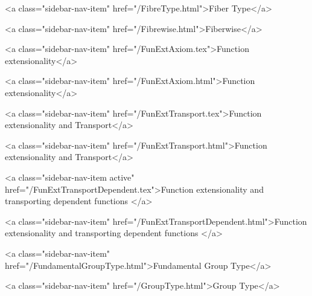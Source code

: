       
    
      
        
          <a class="sidebar-nav-item" href="/FibreType.html">Fiber Type</a>
        
      
    
      
        
          <a class="sidebar-nav-item" href="/Fibrewise.html">Fiberwise</a>
        
      
    
      
        
          <a class="sidebar-nav-item" href="/FunExtAxiom.tex">Function extensionality</a>
        
      
    
      
        
          <a class="sidebar-nav-item" href="/FunExtAxiom.html">Function extensionality</a>
        
      
    
      
        
          <a class="sidebar-nav-item" href="/FunExtTransport.tex">Function extensionality and Transport</a>
        
      
    
      
        
          <a class="sidebar-nav-item" href="/FunExtTransport.html">Function extensionality and Transport</a>
        
      
    
      
        
          <a class="sidebar-nav-item active" href="/FunExtTransportDependent.tex">Function extensionality and transporting dependent functions </a>
        
      
    
      
        
          <a class="sidebar-nav-item" href="/FunExtTransportDependent.html">Function extensionality and transporting dependent functions </a>
        
      
    
      
        
          <a class="sidebar-nav-item" href="/FundamentalGroupType.html">Fundamental Group Type</a>
        
      
    
      
        
          <a class="sidebar-nav-item" href="/GroupType.html">Group Type</a>
        
      
    
